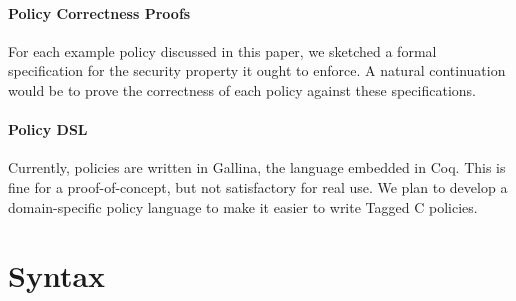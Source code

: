 \documentclass{llncs}
\begin{document}
\paragraph{Policy Correctness Proofs}

For each example policy discussed in this paper, we sketched a formal specification for the
security property it ought to enforce. A natural continuation would be to prove the correctness
of each policy against these specifications.

\paragraph{Policy DSL}

Currently, policies are written in Gallina, the language embedded in Coq. This is fine for a
proof-of-concept, but not satisfactory for real use. We plan to develop a domain-specific policy
language to make it easier to write Tagged C policies.




\appendix

\section{Syntax}
\end{document}
